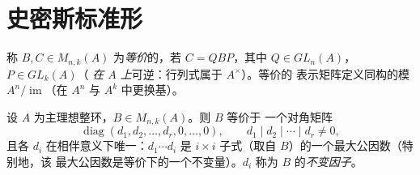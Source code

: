 \section{史密斯标准形}

\begin{definition}\label{def:b3:modules:equivalence}
称 $B, C \in M_{n,k}(A)$ 为\emph{等价}的，若 $C =
QBP$，其中 $Q \in GL_n(A)$，$P \in GL_k(A)$（
\emph{在 $A$ 上}可逆：行列式属于 $A^\times$）。等价的
表示矩阵定义同构的模 $A^n/
\operatorname{im}$（在 $A^n$ 与 $A^k$ 中更换基）。
\end{definition}

\begin{theorem}[史密斯标准形]\label{thm:b3:modules:smith}
设 $A$ 为主理想整环，$B \in M_{n,k}(A)$。则 $B$ 等价于
一个对角矩阵
\[
\operatorname{diag}(d_1, d_2, \dots, d_r, 0, \dots, 0),
\qquad d_1 \mid d_2 \mid \cdots \mid d_r \neq 0 ,
\]
且各 $d_i$ 在相伴意义下唯一：$d_1 \cdots d_i$ 是
$i \times i$ 子式（取自 $B$）的一个最大公因数（特别地，该
最大公因数是等价下的一个不变量）。$d_i$ 称为
$B$ 的\emph{不变因子}。
\end{theorem}

